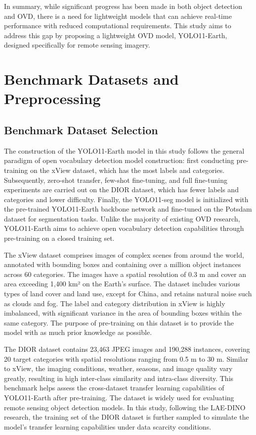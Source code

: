\documentclass{article}
\begin{document}
In summary, while significant progress has been made in both object  
detection and OVD, there is a need for lightweight models that can  
achieve real-time performance with reduced computational requirements.  
This study aims to address this gap by proposing a lightweight OVD  
model, YOLO11-Earth, designed specifically for remote sensing imagery.

\section{Benchmark Datasets and Preprocessing}

\subsection{Benchmark Dataset Selection}
The construction of the YOLO11-Earth model in this study 
follows the general paradigm of open vocabulary detection model construction:
first conducting pre-training on the xView dataset, which has the 
most labels and categories. Subsequently, zero-shot transfer, 
few-shot fine-tuning, and full fine-tuning experiments are carried 
out on the DIOR dataset, which has fewer labels and categories 
and lower difficulty. Finally, the YOLO11-seg model is initialized 
with the pre-trained YOLO11-Earth backbone network and fine-tuned 
on the Potsdam dataset for segmentation tasks. Unlike the majority 
of existing OVD research, YOLO11-Earth aims to achieve open vocabulary 
detection capabilities through pre-training on a closed training set.

The xView dataset \cite{lam2018xview} comprises images of complex scenes from around 
the world, annotated with bounding boxes and containing over a 
million object instances across 60 categories. The images have a 
spatial resolution of 0.3 m and cover an area exceeding 1,400 km² 
on the Earth's surface. The dataset includes various types of 
land cover and land use, except for China, and retains natural 
noise such as clouds and fog. The label and category distribution 
in xView is highly imbalanced, with significant variance in the 
area of bounding boxes within the same category. The purpose of 
pre-training on this dataset is to provide the model with as 
much prior knowledge as possible.

The DIOR dataset \cite{li2020object} contains 23,463 JPEG images and 190,288 instances, 
covering 20 target categories with spatial resolutions ranging 
from 0.5 m to 30 m. Similar to xView, the imaging conditions, 
weather, seasons, and image quality vary greatly, resulting in 
high inter-class similarity and intra-class diversity. This benchmark 
helps assess the cross-dataset transfer learning capabilities of 
YOLO11-Earth after pre-training. The dataset is widely used for 
evaluating remote sensing object detection models. In this study, 
following the LAE-DINO research, the training set of the DIOR 
dataset is further sampled to simulate the model's transfer 
learning capabilities under data scarcity conditions.
\end{document}
